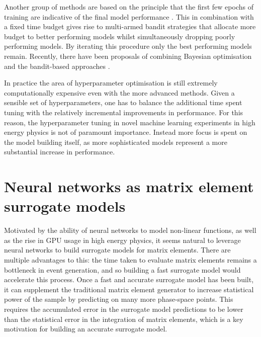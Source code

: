 \documentclass[main.tex]{subfiles}
\begin{document}
    Another group of methods are based on the principle
    that the first few epochs of training are indicative
    of the final model performance \cite{pmlr-v28-bubeck13}. This in combination
    with a fixed time budget gives rise to multi-armed
    bandit strategies \cite{jamieson2016non,li2017hyperband}
    that allocate more budget to better
    performing models whilst simultaneously dropping poorly
    performing models. By iterating this procedure only the 
    best performing models remain. Recently, there have
    been proposals of combining Bayesian optimisation and
    the bandit-based approaches \cite{falkner2018bohb}.
    
    In practice the area of hyperparameter optimisation
    is still extremely computationally expensive even with
    the more advanced methods. Given a sensible set of hyperparameters,
    one has to balance the additional time spent tuning with the
    relatively incremental improvements in performance. For this reason,
    the hyperparameter tuning in novel machine learning experiments
    in high energy physics is not of paramount importance.
    Instead more focus is spent on the model building itself, as
    more sophisticated models represent a more substantial increase
    in performance.

\section{Neural networks as matrix element surrogate models}\label{sec:NN_ME}
    Motivated by the ability of neural networks to
    model non-linear functions, as well as the rise
    in GPU usage in high energy physics, it seems
    natural to leverage neural networks to build surrogate
    models for matrix elements. There are multiple advantages
    to this: the time taken to evaluate matrix elements remains
    a bottleneck in event generation, and so building a
    fast surrogate model would accelerate this process.
    Once a fast and accurate surrogate model has been
    built, it can supplement the traditional matrix
    element generator to increase statistical power of the sample
    by predicting on many more phase-space points. This
    requires the accumulated error in the surrogate model
    predictions to be lower than the statistical error in the
    integration of matrix elements, which is a key motivation
    for building an accurate surrogate model.
\end{document}
